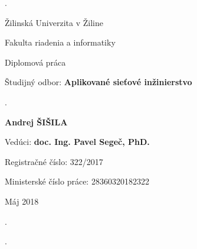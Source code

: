 \begin{titlepage}

\phantom.

\bigskip

\begin{center}
{\sc\LARGE Žilinská Univerzita v Žiline}
\medskip

{\sc\Large Fakulta riadenia a informatiky}

\vfill\vfill\vfill\vfill

{\sc\LARGE Diplomová práca}

\medskip

{\large Študijný odbor: {\bf Aplikované sieťové inžinierstvo}}
\end{center}


\vfill\vfill\vfill\vfill


\phantom.\hfill
\begin{center}
{\large\bf Andrej ŠIŠILA}

\medskip

{\large\bf \nazovpraceSK}

\medskip

Vedúci: {\bf doc. Ing. Pavel Segeč, PhD.}

\medskip
\bigskip

Registračné číslo: 322/2017

\medskip

Ministerské číslo práce: 28360320182322

\medskip

Máj 2018

\end{center}
\hspace{1.7cm}\phantom.

\vspace{2.9cm}

\phantom.
\end{titlepage}



\begin{abstract}

\noindent
{\sc Šišila Andrej:} {\em \nazovpraceSK}
[Diplomová práca] 

\noindent
Žilinská Univerzita v~Žiline,  
Fakulta riadenia a informatiky,  
Katedra informačných sietí.

\noindent  
Vedúci: doc. Ing. Pavel Segeč, PhD.
 
\noindent  
Stupeň odbornej kvalifikácie:
Inžinier v odbore Aplikované sieťové inžinierstvo, Žilina. 

\noindent
FRI ŽU v Žiline, 2017 TODO s.

\bigskip

Obsahom práce je ... TODO


\end{abstract}


